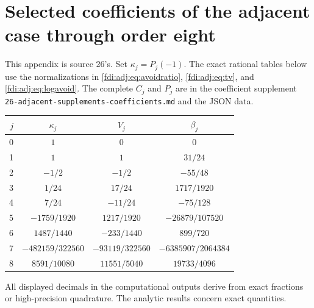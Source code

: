 \documentclass[11pt,letterpaper]{article}
\theoremstyle{remark}\newtheorem{remark}[theorem]{Remark}
\begin{document}
\appendix
\section{Selected coefficients of the adjacent case through order eight}\label{fdi:adj:app:coefficients}
This appendix is source 26's. Set $\kappa_j=P_j(-1)$. The exact rational tables below use the normalizations in \eqref{fdi:adj:eq:avoidratio}, \eqref{fdi:adj:eq:tv}, and \eqref{fdi:adj:eq:logavoid}. The complete $C_j$ and $P_j$ are in the coefficient supplement \texttt{26-adjacent-supplements-coefficients.md} and the JSON data.
\begin{center}\renewcommand{\arraystretch}{1.45}
\begin{tabular}{rccc}
\toprule
$j$ & $\kappa_j$ & $V_j$ & $\beta_j$\\
\midrule
0 & $1$ & $0$ & $0$\\
1 & $1$ & $1$ & $31/24$\\
2 & $-1/2$ & $-1/2$ & $-55/48$\\
3 & $1/24$ & $17/24$ & $1717/1920$\\
4 & $7/24$ & $-11/24$ & $-75/128$\\
5 & $-1759/1920$ & $1217/1920$ & $-26879/107520$\\
6 & $1487/1440$ & $-233/1440$ & $899/720$\\
7 & $-482159/322560$ & $-93119/322560$ & $-6385907/2064384$\\
8 & $8591/10080$ & $11551/5040$ & $19733/4096$\\
\bottomrule
\end{tabular}\end{center}
All displayed decimals in the computational outputs derive from exact fractions or high-precision quadrature. The analytic results concern exact quantities.
\end{document}
